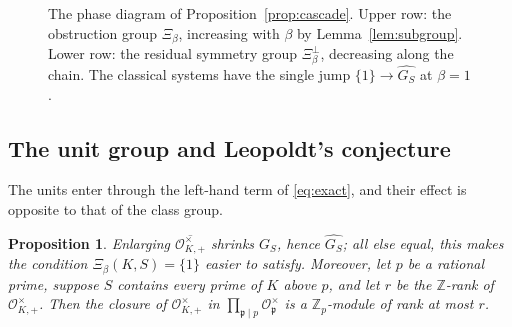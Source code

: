 \documentclass[11pt]{amsart}
\numberwithin{equation}{section}
\newtheorem{proposition}[theorem]{Proposition}
\theoremstyle{definition}
\theoremstyle{remark}
\newcommand{\Z}{\mathbb{Z}}
\newcommand{\cO}{\mathcal{O}}
\newcommand{\pp}{\mathfrak{p}}
\begin{document}
\begin{figure}[htbp]
\centering
{}
\caption{The phase diagram of Proposition~\ref{prop:cascade}. Upper row: the obstruction
group $\Xi_\beta$, increasing with $\beta$ by Lemma~\ref{lem:subgroup}. Lower row: the
residual symmetry group $\Xi_\beta^\perp$, decreasing along the chain. The classical
systems have the single jump $\{1\}\to\widehat{G_S}$ at $\beta=1$.}
\label{fig:cascade}
\end{figure}

\subsection{The unit group and Leopoldt's conjecture}\label{sec:units}

The units enter through the left-hand term of \eqref{eq:exact}, and their effect
is opposite to that of the class group.

\begin{proposition}\label{prop:units}
Enlarging $\overline{\cO^\times_{K,+}}$ shrinks $G_S$, hence $\widehat{G_S}$;
all else equal, this makes the condition $\Xi_\beta(K,S)=\{1\}$ easier to
satisfy. Moreover, let $p$ be a rational prime, suppose $S$ contains every
prime of $K$ above $p$, and let $r$ be the $\Z$-rank of $\cO^\times_{K,+}$.
Then the closure of $\cO^\times_{K,+}$ in $\prod_{\pp\mid p}\cO_\pp^\times$ is a
$\Z_p$-module of rank at most $r$.
\end{proposition}
\end{document}
